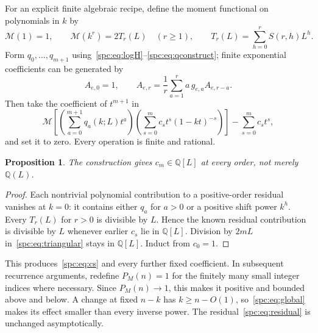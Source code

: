 \documentclass[11pt,letterpaper]{article}
\newtheorem{proposition}[theorem]{Proposition}
\theoremstyle{definition}\newtheorem{definition}[theorem]{Definition}
\theoremstyle{remark}\newtheorem{remark}[theorem]{Remark}
\newcommand{\Q}{\mathbb Q}
\begin{document}
For an explicit finite algebraic recipe, define the moment functional on polynomials in $k$ by
\begin{equation}\label{spc:eq:touchard}
 \mathcal M(1)=1,\qquad
 \mathcal M(k^r)=2T_r(L)\quad(r\ge1),\qquad
 T_r(L)=\sum_{h=0}^rS(r,h)L^h.
\end{equation}
Form $q_0,\ldots,q_{m+1}$ using~\eqref{spc:eq:logH}--\eqref{spc:eq:qconstruct}; finite exponential coefficients can be generated by
\[
 A_{e,0}=1,\qquad
 A_{e,r}=\frac1r\sum_{a=1}^r a\,g_{e,a}A_{e,r-a}.
\]
Then take the coefficient of $t^{m+1}$ in
\begin{equation}\label{spc:eq:residualalgorithm}
 \mathcal M\left[\left(\sum_{a=0}^{m+1}q_a(k;L)t^a\right)
       \left(\sum_{s=0}^{m}c_st^s(1-kt)^{-s}\right)\right]
       -\sum_{s=0}^{m}c_st^s,
\end{equation}
and set it to zero. Every operation is finite and rational.

\begin{proposition}\label{spc:prop:ring}
The construction gives $c_m\in\Q[L]$ at every order, not merely $\Q(L)$.
\end{proposition}
\begin{proof}
Each nontrivial polynomial contribution to a positive-order residual vanishes at $k=0$: it contains either $q_a$ for $a>0$ or a positive shift power $k^h$. Every $T_r(L)$ for $r>0$ is divisible by $L$. Hence the known residual contribution is divisible by $L$ whenever earlier $c_s$ lie in $\Q[L]$. Division by $2mL$ in~\eqref{spc:eq:triangular} stays in $\Q[L]$. Induct from $c_0=1$.
\end{proof}
This produces~\eqref{spc:eq:cs} and every further fixed coefficient. In subsequent recurrence arguments, redefine $P_M(n)=1$ for the finitely many small integer indices where necessary. Since $P_M(n)\to1$, this makes it positive and bounded above and below. A change at fixed $n-k$ has $k\ge n-O(1)$, so~\eqref{spc:eq:global} makes its effect smaller than every inverse power. The residual~\eqref{spc:eq:residual} is unchanged asymptotically.
\end{document}
